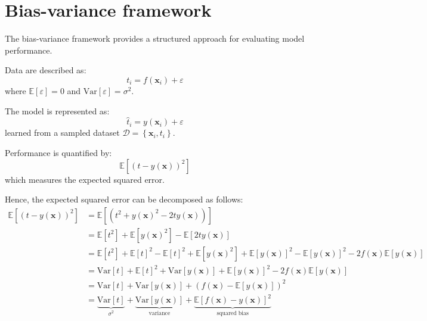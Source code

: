 \section{Bias-variance framework}

The bias-variance framework provides a structured approach for evaluating model performance.
\begin{definition}
    Data are described as:
    \[t_i=f(\textbf{x}_i)+\varepsilon\]
    where $\mathbb{E}\left[\varepsilon\right]=0$ and $\text{Var}\left[\varepsilon\right]=\sigma^2$. 
\end{definition}
\begin{definition}
    The model is represented as:
    \[\hat{t}_i=y(\textbf{x}_i)+\varepsilon\]
    learned from a sampled dataset $\mathcal{D}=\left\{ \textbf{x}_i,t_i \right\}$. 
\end{definition}
\begin{definition}
    Performance is quantified by:
    \[\mathbb{E}\left[ \left( t-y(\textbf{x}) \right)^2 \right]\]
    which measures the expected squared error.
\end{definition}
Hence, the expected squared error can be decomposed as follows:
\begin{align*}
    \mathbb{E}\left[ \left( t-y(\textbf{x}) \right)^2 \right]   &= \mathbb{E}\left[ \left( t^2+y(\textbf{x})^2-2ty(\textbf{x}) \right) \right] \\
                                                                &= \mathbb{E}\left[ t^2  \right]+ \mathbb{E}\left[y(\textbf{x})^2 \right]- \mathbb{E}\left[2ty(\textbf{x}) \right] \\
                                                                &= \mathbb{E}\left[ t^2  \right] + \mathbb{E}\left[ t \right]^2 - \mathbb{E}\left[ t \right]^2+ \mathbb{E}\left[y(\textbf{x})^2 \right] +  \mathbb{E}\left[y(\textbf{x}) \right]^2 - \mathbb{E}\left[y(\textbf{x}) \right]^2 -  2f(\textbf{x})\mathbb{E}\left[y(\textbf{x}) \right] \\
                                                                &= \text{Var}\left[ t  \right] + \mathbb{E}\left[ t \right]^2+ \text{Var}\left[y(\textbf{x}) \right] +  \mathbb{E}\left[y(\textbf{x}) \right]^2 -  2f(\textbf{x})\mathbb{E}\left[y(\textbf{x}) \right] \\
                                                                &= \text{Var}\left[ t  \right] +  \text{Var}\left[y(\textbf{x}) \right] +  \left(f(\textbf{x}) -\mathbb{E}\left[y(\textbf{x}) \right]\right)^2 \\
                                                                &= \underbrace{\text{Var}\left[ t  \right]}_{\sigma^2}  +  \underbrace{\text{Var}\left[y(\textbf{x}) \right]}_{\text{variance}}  +  \underbrace{\mathbb{E}\left[f(\textbf{x}) -y(\textbf{x}) \right]^2}_{\text{squared bias}} 
\end{align*}
